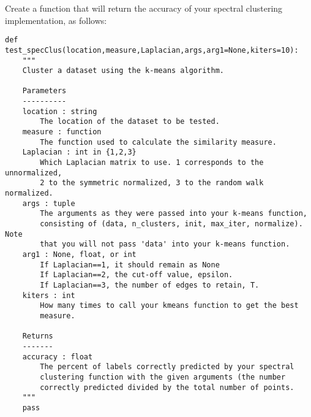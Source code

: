 Create a function that will return the accuracy of your spectral clustering implementation, as follows:
\begin{lstlisting}
def test_specClus(location,measure,Laplacian,args,arg1=None,kiters=10):
    """
    Cluster a dataset using the k-means algorithm.

    Parameters
    ----------
    location : string
        The location of the dataset to be tested.
    measure : function
        The function used to calculate the similarity measure.
    Laplacian : int in {1,2,3}
        Which Laplacian matrix to use. 1 corresponds to the unnormalized,
        2 to the symmetric normalized, 3 to the random walk normalized.
    args : tuple
        The arguments as they were passed into your k-means function,
        consisting of (data, n_clusters, init, max_iter, normalize). Note
        that you will not pass 'data' into your k-means function.
    arg1 : None, float, or int
        If Laplacian==1, it should remain as None
        If Laplacian==2, the cut-off value, epsilon.
        If Laplacian==3, the number of edges to retain, T.
    kiters : int
        How many times to call your kmeans function to get the best
        measure.
    
    Returns
    -------
    accuracy : float
        The percent of labels correctly predicted by your spectral
        clustering function with the given arguments (the number
        correctly predicted divided by the total number of points.
    """
    pass
\end{lstlisting}

